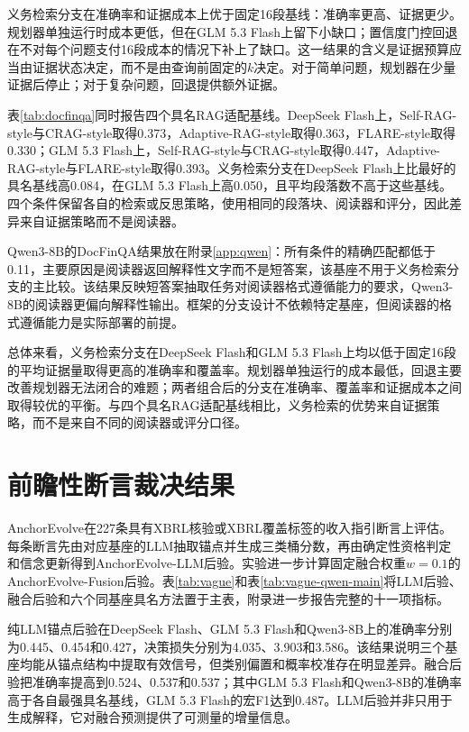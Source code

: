 义务检索分支在准确率和证据成本上优于固定16段基线：准确率更高、证据更少。规划器单独运行时成本更低，但在GLM 5.3 Flash上留下小缺口；置信度门控回退在不对每个问题支付16段成本的情况下补上了缺口。这一结果的含义是证据预算应当由证据状态决定，而不是由查询前固定的$k$决定。对于简单问题，规划器在少量证据后停止；对于复杂问题，回退提供额外证据。

表\ref{tab:docfinqa}同时报告四个具名RAG适配基线。DeepSeek Flash上，Self-RAG-style与CRAG-style取得0.373，Adaptive-RAG-style取得0.363，FLARE-style取得0.330；GLM 5.3 Flash上，Self-RAG-style与CRAG-style取得0.447，Adaptive-RAG-style与FLARE-style取得0.393。义务检索分支在DeepSeek Flash上比最好的具名基线高0.084，在GLM 5.3 Flash上高0.050，且平均段落数不高于这些基线。四个条件保留各自的检索或反思策略，使用相同的段落块、阅读器和评分，因此差异来自证据策略而不是阅读器。

Qwen3-8B的DocFinQA结果放在附录\ref{app:qwen}：所有条件的精确匹配都低于0.11，主要原因是阅读器返回解释性文字而不是短答案，该基座不用于义务检索分支的主比较。该结果反映短答案抽取任务对阅读器格式遵循能力的要求，Qwen3-8B的阅读器更偏向解释性输出。框架的分支设计不依赖特定基座，但阅读器的格式遵循能力是实际部署的前提。



总体来看，义务检索分支在DeepSeek Flash和GLM 5.3 Flash上均以低于固定16段的平均证据量取得更高的准确率和覆盖率。规划器单独运行的成本最低，回退主要改善规划器无法闭合的难题；两者组合后的分支在准确率、覆盖率和证据成本之间取得较优的平衡。与四个具名RAG适配基线相比，义务检索的优势来自证据策略，而不是来自不同的阅读器或评分口径。

\section{前瞻性断言裁决结果}

AnchorEvolve在227条具有XBRL核验或XBRL覆盖标签的收入指引断言上评估。每条断言先由对应基座的LLM抽取锚点并生成三类桶分数，再由确定性资格判定和信念更新得到AnchorEvolve-LLM后验。实验进一步计算固定融合权重$w=0.1$的AnchorEvolve-Fusion后验。表\ref{tab:vague}和表\ref{tab:vague-qwen-main}将LLM后验、融合后验和六个同基座具名方法置于主表，附录进一步报告完整的十一项指标。

纯LLM锚点后验在DeepSeek Flash、GLM 5.3 Flash和Qwen3-8B上的准确率分别为0.445、0.454和0.427，决策损失分别为4.035、3.903和3.586。该结果说明三个基座均能从锚点结构中提取有效信号，但类别偏置和概率校准存在明显差异。融合后验把准确率提高到0.524、0.537和0.537；其中GLM 5.3 Flash和Qwen3-8B的准确率高于各自最强具名基线，GLM 5.3 Flash的宏F1达到0.487。LLM后验并非只用于生成解释，它对融合预测提供了可测量的增量信息。

